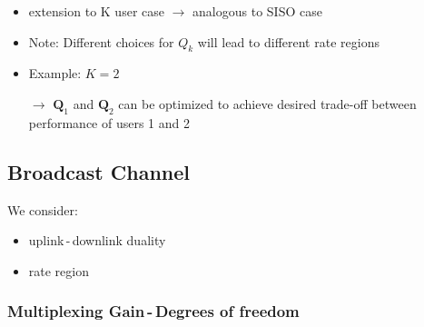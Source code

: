 \documentclass[a4paper, 10pt]{article}
\begin{document}
\begin{itemize}
	\item extension to K user case $\rightarrow $ analogous to SISO case
	\item Note: Different choices for $Q_k $ will lead to different rate regions
	\item Example: $ K = 2$
	\item[$\rightarrow$] $\mathbf{Q}_1 $ and $ \mathbf{Q}_2 $ can be optimized to achieve desired trade-off between  performance of users 1 and 2
\end{itemize}
\subsection{Broadcast Channel}
We consider:
\begin{itemize}
	\item uplink\,-\,downlink duality
	\item rate region
\end{itemize}
\subsubsection{Multiplexing Gain\,-\,Degrees of freedom}
\end{document}
